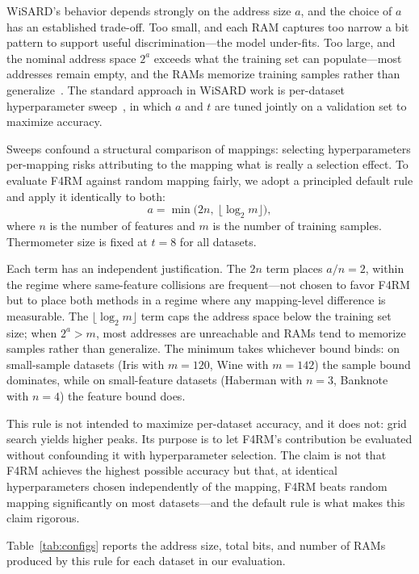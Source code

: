 \documentclass[runningheads]{llncs}
\begin{document}
WiSARD's behavior depends strongly on the address size $a$, and the choice of $a$ has an established trade-off. Too small, and each RAM captures too narrow a bit pattern to support useful discrimination---the model under-fits. Too large, and the nominal address space $2^a$ exceeds what the training set can populate---most addresses remain empty, and the RAMs memorize training samples rather than generalize~\cite{susskind2022bthowen}. The standard approach in WiSARD work is per-dataset hyperparameter sweep~\cite{susskind2022bthowen}, in which $a$ and $t$ are tuned jointly on a validation set to maximize accuracy.

Sweeps confound a structural comparison of mappings: selecting hyperparameters per-mapping risks attributing to the mapping what is really a selection effect. To evaluate F4RM against random mapping fairly, we adopt a principled default rule and apply it identically to both:
\begin{equation}
a = \min\bigl(2n,\ \lfloor \log_2 m \rfloor\bigr),
\label{eq:addr-rule}
\end{equation}
where $n$ is the number of features and $m$ is the number of training samples. Thermometer size is fixed at $t = 8$ for all datasets.

Each term has an independent justification. The $2n$ term places $a/n = 2$, within the regime where same-feature collisions are frequent---not chosen to favor F4RM but to place both methods in a regime where any mapping-level difference is measurable. The $\lfloor \log_2 m \rfloor$ term caps the address space below the training set size; when $2^a > m$, most addresses are unreachable and RAMs tend to memorize samples rather than generalize. The minimum takes whichever bound binds: on small-sample datasets (Iris with $m=120$, Wine with $m=142$) the sample bound dominates, while on small-feature datasets (Haberman with $n=3$, Banknote with $n=4$) the feature bound does.

This rule is not intended to maximize per-dataset accuracy, and it does not: grid search yields higher peaks. Its purpose is to let F4RM's contribution be evaluated without confounding it with hyperparameter selection. The claim is not that F4RM achieves the highest possible accuracy but that, at identical hyperparameters chosen independently of the mapping, F4RM beats random mapping significantly on most datasets---and the default rule is what makes this claim rigorous.

Table~\ref{tab:configs} reports the address size, total bits, and number of RAMs produced by this rule for each dataset in our evaluation.
\end{document}
